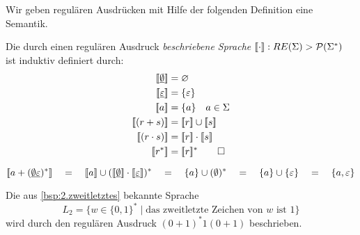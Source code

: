 \medskip

Wir geben regulären Ausdrücken mit Hilfe der folgenden Definition eine Semantik.
\begin{Def}[name={[Semantik eines regulären Ausdrucks]}]
        Die durch einen regulären Ausdruck \emph{beschriebene Sprache} $\llbracket\cdot \rrbracket : RE(\Sigma) \-> \mathcal{P}(\Sigma^*)$ ist induktiv definiert durch:
        \begin{align*}
                \llbracket \0 \rrbracket &= \varnothing\\
                \llbracket \1 \rrbracket &= \{\Eps\}\\
                \llbracket a \rrbracket &= \{a\} \quad a\in\Sigma\\
                \llbracket (r+s) \rrbracket &= \llbracket r\rrbracket \cup \llbracket s\rrbracket\\
                \llbracket (r\cdot s) \rrbracket &= \llbracket r\rrbracket \cdot \llbracket s\rrbracket\\
                \llbracket r^* \rrbracket &= \llbracket r\rrbracket^*
                \qedhere
        \end{align*}
\end{Def}
\begin{Bsp}
$$
\llbracket a + (\0\1)^*\rrbracket
\quad=\quad \llbracket a\rrbracket \cup (\llbracket \0\rrbracket \cdot \llbracket \1\rrbracket)^*
\quad=\quad \{ a\} \cup (\emptyset)^*
\quad=\quad \{ a\} \cup \{\varepsilon\}
\quad=\quad \{ a, \varepsilon\}
$$
\end{Bsp}
\begin{Bsp}
Die aus \autoref{bsp:2.zweitletztes} bekannte Sprache 
$$L_2=\{w\in\{0,1\}^*\mid \text{das zweitletzte Zeichen von $w$ ist $1$}\}$$
wird durch den regulären Ausdruck $(0+1)^*1(0+1)$ beschrieben.
\end{Bsp}


